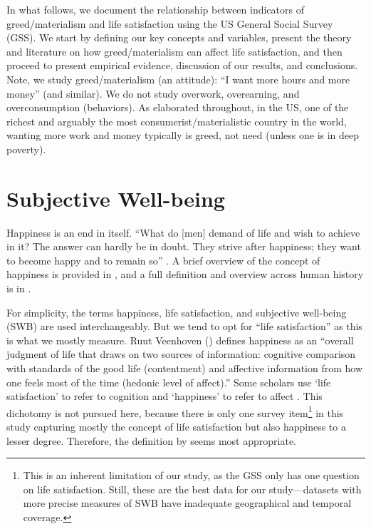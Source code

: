 \documentclass[10pt, letterpaper]{article}
\begin{document}
\begin{spacing}{1.8}
In what follows, we document the relationship between indicators of
greed/materialism and life satisfaction using the US General Social Survey
(GSS). We start by defining our key concepts and variables, present the theory
and literature on how greed/materialism can affect life satisfaction, and
then proceed to present empirical evidence, discussion of our results, and
conclusions.
 Note, we study greed/materialism (an attitude): ``I want more hours and more
money'' (and similar). 
%
 We do not study overwork, overearning, and
overconsumption (behaviors). %
As elaborated throughout, in the US, one of the
richest and arguably the most consumerist/materialistic country in the world, wanting more
work and money typically is greed, not need (unless one is in deep poverty).

\section{Subjective Well-being}


Happiness is an end in itself. ``What do [men] demand of life and wish to
achieve in it? The answer can hardly be in doubt. They strive after happiness;
they want to become happy and to remain so'' \citep[][p. 52]{freud30}. 
A brief overview of the concept of happiness is provided in
\citet{mcmahon05}, and a full definition and overview across human history is in \citet{mcmahon06}.

For simplicity, the terms happiness, life satisfaction, and
subjective well-being (SWB) are used interchangeably. But we tend to opt for
``life satisfaction'' as this is what we mostly measure.
Ruut Veenhoven (\citeyear[p. 2]{veenhoven08}) defines happiness as an ``overall judgment of life that draws on two sources of information: cognitive comparison with standards of the good life (contentment) and affective information from how one feels most of the time (hedonic level of affect).''
Some scholars use `life satisfaction' to  refer to cognition and `happiness' to
refer to affect \citep[e.g.,][]{dorahy98etal}. This dichotomy is not pursued here, because there is only one survey item\footnote{This is an inherent limitation of our
study, as the GSS only has one question on life satisfaction. Still, these are the best data for our study---datasets with more precise measures of SWB have inadequate geographical and temporal coverage.} in this study capturing mostly the concept of life satisfaction but also happiness to a lesser degree. Therefore, the definition by \citet{veenhoven08} seems most appropriate.
 

\end{spacing}
\end{document}
